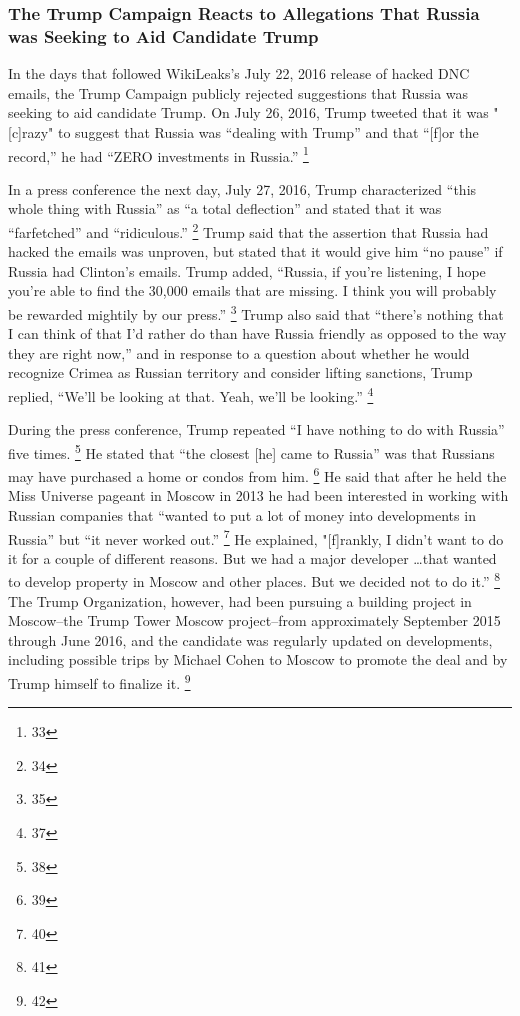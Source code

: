 \subsubsection{The Trump Campaign Reacts to Allegations That Russia was Seeking to Aid Candidate Trump}
In the days that followed WikiLeaks's July 22, 2016 release of hacked DNC emails, the Trump Campaign publicly rejected suggestions that Russia was seeking to aid candidate Trump. 
On July 26, 2016, Trump tweeted that it was "[c]razy" to suggest that Russia was ``dealing with Trump'' and that ``[f]or the record,'' he had ``ZERO investments in Russia.''%
\footnote{33}

In a press conference the next day, July 27, 2016, Trump characterized ``this whole thing with Russia'' as ``a total deflection'' and stated that it was ``farfetched'' and ``ridiculous.''%
\footnote{34}
Trump said that the assertion that Russia had hacked the emails was unproven, but stated that it would give him ``no pause'' if Russia had Clinton's emails.%
Trump added, ``Russia, if you're listening, I hope you're able to find the 30,000 emails that are missing. I think you will probably be rewarded mightily by our press.''%
\footnote{35}
Trump also said that ``there's nothing that I can think of that I'd rather do than have Russia friendly as opposed to the way they are right now,'' and in response to a question about whether he would recognize Crimea as Russian territory and consider lifting sanctions, Trump replied, ``We'll be looking at that. Yeah, we'll be looking.''%
\footnote{37}

During the press conference, Trump repeated ``I have nothing to do with Russia'' five times.%
\footnote{38}
He stated that ``the closest [he] came to Russia'' was that Russians may have purchased a home or condos from him.%
\footnote{39}
He said that after he held the Miss Universe pageant in Moscow in 2013 he had been interested in working with Russian companies that ``wanted to put a lot of money into developments in Russia'' but ``it never worked out.''%
\footnote{40}
He explained, "[f]rankly, I didn't want to do it for a couple of different reasons. 
But we had a major developer \dots that wanted to develop property in Moscow and other places. 
But we decided not to do it.''%
\footnote{41}
The Trump Organization, however, had been pursuing a building project in Moscow--the Trump Tower Moscow project--from approximately September 2015 through June 2016, and the candidate was regularly updated on developments, including possible trips by Michael Cohen to Moscow to promote the deal and by Trump himself to finalize it.%
\footnote{42}

